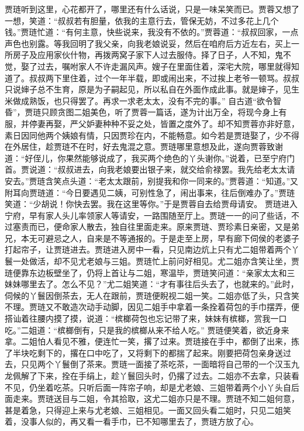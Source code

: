 \documentclass[12pt,oneside]{book}
\begin{document}
贾琏听到这里，心花都开了，哪里还有什么话说，只是一味呆笑而已。贾蓉又想了一想，笑道：“叔叔若有胆量，依我的主意行去，管保无妨，不过多花上几个钱。”贾琏忙道：“有何主意，快些说来，我没有不依的。”贾蓉道：“叔叔回家，一点声色也别露。等我回明了我父亲，向我老娘说妥，然后在咱府后方近左右，买上一所房子及应用家伙什物，再拨两窝子家下人过去服侍。择了日子，人不知，鬼不觉，娶了过去，嘱咐家人不许走漏风声。嫂子在里面住着，深宅大院，哪里就得知道了。叔叔两下里住着，过个一年半载，即或闹出来，不过挨上老爷一顿骂。叔叔只说婶子总不生育，原是为子嗣起见，所以私自在外面作成此事。就是婶子，见生米做成熟饭，也只得罢了。再求一求老太太，没有不完的事。”
自古道“欲令智昏”，贾琏只顾贪图二姐美色，听了贾蓉一篇话，遂为计出万全，将现今身上有服，并停妻再娶，严父妒妻种种不妥之处，皆置之度外了。却不知贾蓉亦非好意，素日因同他两个姨娘有情，只因贾珍在内，不能畅意。如今若是贾琏娶了，少不得在外居住，趁贾琏不在时，好去鬼混之意。贾琏哪里意想及此，遂向贾蓉致谢道：“好侄儿，你果然能够说成了，我买两个绝色的丫头谢你。”说着，已至宁府门首。贾说道：“叔叔进去，向我老娘要出银子来，就交给俞禄罢。我先给老太太请安去。”贾琏含笑点头道：“老太太跟前，别提我和你一同来的。”贾蓉道：“知道。”又附耳向贾琏道：“今日要遇见二姨，可别性急了，闹出事来，往后倒难办了。”贾琏笑道：“少胡说！你快去罢。我在这里等你。”于是贾蓉自去给贾母请安。
贾琏进入宁府，早有家人头儿率领家人等请安，一路围随至厅上。贾琏一一的问了些话，不过塞责而已，便命家人散去，独自往里面走来。原来贾琏、贾珍素日亲密，又是弟兄，本无可避忌之人，自来是不等通报的。于是走至上房，早有廊下伺侯的老婆子打起帘子，让贾琏进去。贾琏进入房中一看，只见南边炕上只有尤二姐带着两个丫鬟一处做活，却不见尤老娘与三姐。贾琏忙上前问好相见。尤二姐亦含笑让坐，贾琏便靠东边板壁坐了，仍将上首让与二姐，寒温毕，贾琏笑问道：“亲家太太和三妹妹哪里去了。怎么不见？”尤二姐笑道：“才有事往后头去了，也就来的。”此时，伺候的丫鬟因倒茶去，无人在跟前，贾琏便睨视二姐一笑。二姐亦低了头，只含笑不理。贾琏又不敢造次动手动脚，因见二姐手中拿着一条拴着荷包的手巾摆弄，便搭讪着往腰内摸了摸，说道：“槟榔荷包也忘记带了来，妹妹有槟榔，赏我一口吃。”二姐道：“槟榔倒有，只是我的槟榔从来不给人吃。”
贾琏便笑着，欲近身来拿。二姐怕人看见不雅，便连忙一笑，撂了过来。贾琏接在手中，都倒了出来，拣了半块吃剩下的，撂在口中吃了，又将剩下的都揣了起来。刚要把荷包亲身送过去，只见两个丫鬟倒了茶来。贾琏一面接了茶吃茶，一面暗将自己带的一个汉玉九龙佩解了下来，拴在手绢上，趁丫鬟回头时，仍撂了过去。二姐亦不去拿，只装看不见，仍坐着吃茶。只听后面一阵帘子响，却是尤老娘、三姐带着两个小丫头自后面走来。贾琏送目与二姐，令其拾取，这尤二姐亦只是不理。贾琏不知二姐何意，甚是着急，只得迎上来与尤老娘、三姐相见。一面又回头看二姐时，只见二姐笑着，没事人似的，再又看一看手巾，已不知哪里去了，贾琏方放了心。
\end{document}
